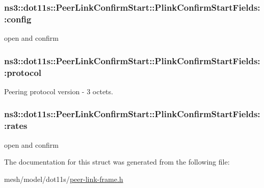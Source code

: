 \subsubsection[{\texorpdfstring{config}{config}}]{ ns3\+::dot11s\+::\+Peer\+Link\+Confirm\+Start\+::\+Plink\+Confirm\+Start\+Fields\+::config}\hypertarget{structns3_1_1dot11s_1_1PeerLinkConfirmStart_1_1PlinkConfirmStartFields_a895b407b26876bb0e739c3235d75b3c9}{}\label{structns3_1_1dot11s_1_1PeerLinkConfirmStart_1_1PlinkConfirmStartFields_a895b407b26876bb0e739c3235d75b3c9}


open and confirm 

\subsubsection[{\texorpdfstring{protocol}{protocol}}]{ ns3\+::dot11s\+::\+Peer\+Link\+Confirm\+Start\+::\+Plink\+Confirm\+Start\+Fields\+::protocol}\hypertarget{structns3_1_1dot11s_1_1PeerLinkConfirmStart_1_1PlinkConfirmStartFields_aca5791134d7b4ce665a80cbd5d0d2018}{}\label{structns3_1_1dot11s_1_1PeerLinkConfirmStart_1_1PlinkConfirmStartFields_aca5791134d7b4ce665a80cbd5d0d2018}


Peering protocol version -\/ 3 octets. 

\subsubsection[{\texorpdfstring{rates}{rates}}]{ ns3\+::dot11s\+::\+Peer\+Link\+Confirm\+Start\+::\+Plink\+Confirm\+Start\+Fields\+::rates}\hypertarget{structns3_1_1dot11s_1_1PeerLinkConfirmStart_1_1PlinkConfirmStartFields_a0668faf13fbebdcdac4843fd3e1e3df6}{}\label{structns3_1_1dot11s_1_1PeerLinkConfirmStart_1_1PlinkConfirmStartFields_a0668faf13fbebdcdac4843fd3e1e3df6}


open and confirm 



The documentation for this struct was generated from the following file\+:\begin{DoxyCompactItemize}
\item 
mesh/model/dot11s/\hyperlink{peer-link-frame_8h}{peer-\/link-\/frame.\+h}\end{DoxyCompactItemize}
